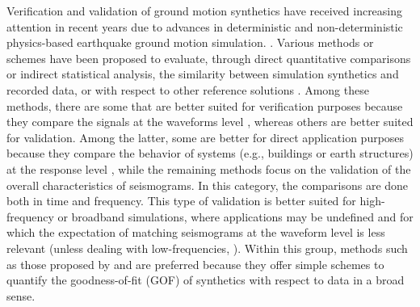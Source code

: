 
\introduction

Verification and validation of ground motion synthetics have received increasing attention in recent years due to advances in deterministic and non-deterministic physics-based earthquake ground motion simulation. . Various methods or schemes have been proposed to evaluate, through direct quantitative comparisons or indirect statistical analysis, the similarity between simulation synthetics and recorded data, or with respect to other reference solutions \citep{Anderson_2004_Proc, Kristekova_2006_BSSA, Kristekova_2009_GJI, Olsen_2010_SRL, Burks_BSSA_2014, Rezaeian_2015_BSSA}. Among these methods, there are some that are better suited for verification purposes because they compare the signals at the waveforms level \citep{Kristekova_2006_BSSA, Kristekova_2009_GJI}, whereas others are better suited for validation. Among the latter, some are better for direct application purposes because they compare the behavior of systems (e.g., buildings or earth structures) at the response level \citep{Burks_BSSA_2014}, while the remaining methods focus on the validation of the overall characteristics of seismograms. In this category, the comparisons are done both in time and frequency. This type of validation is better suited for high-frequency or broadband simulations, where applications may be undefined and for which the expectation of matching seismograms at the waveform level is less relevant (unless dealing with low-frequencies, ). Within this group, methods such as those proposed by \citet{Anderson_2004_Proc} and \citet{Olsen_2010_SRL} are preferred because they offer simple schemes to quantify the goodness-of-fit (GOF) of synthetics with respect to data in a broad sense. 

